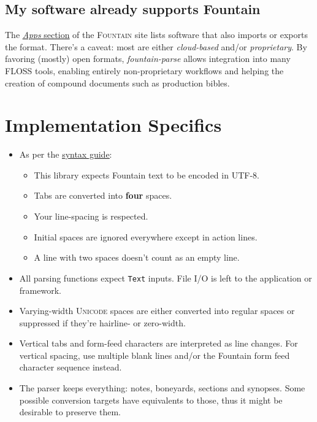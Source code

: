 \documentclass[11pt]{article}
\newcommand{\link}[2]{\underline{\color{darkblue}\href{#1}{#2}}}
\begin{document}
\subsection*{My software already supports Fountain}
The \link{https://fountain.io/apps/}{\emph{Apps} section} of the
\textsc{Fountain} site lists software that also imports or exports the
format. There's a caveat: most are either \emph{cloud-based} and/or
\emph{proprietary}. By favoring (mostly) open formats,
\emph{fountain-parse} allows integration into many \textsc{FLOSS} tools,
enabling entirely non-proprietary workflows and helping the creation of
compound documents such as production bibles.

\section*{Implementation Specifics}
  \begin{itemize}
    \item As per the \link{https://fountain.io/syntax/}{syntax guide}:
      \begin{itemize}
        \item This library expects Fountain text to be encoded in
          \textsc{UTF-8}.
        \item Tabs are converted into \textbf{four} spaces.
        \item Your line-spacing is respected.
        \item Initial spaces are ignored everywhere except in action
          lines.
        \item A line with two spaces doesn't count as an empty line.
      \end{itemize}
    \item All parsing functions expect \texttt{Text} inputs.  File I/O
      is left to the application or framework.
    \item Varying-width \textsc{Unicode} spaces are either converted
      into regular spaces or suppressed if they're hairline- or
      zero-width.
    \item Vertical tabs and form-feed characters are interpreted as line
      changes. For vertical spacing, use multiple blank lines and/or the
      Fountain form feed character sequence instead.
    \item The parser keeps everything: notes, boneyards, sections and
      synopses. Some possible conversion targets have equivalents to
      those, thus it might be desirable to preserve them.
  \end{itemize}
\end{document}
